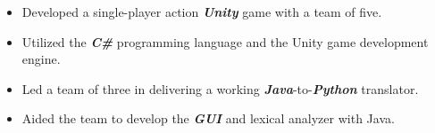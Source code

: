 \documentclass[10pt,a4paper,ragged2e,withhyper]{altacv}
\begin{document}
\begin{paracol}{2}
\begin{itemize}
\item Developed a single-player action \textbf{\textit{Unity}} game with a team of five.
\item Utilized the \textbf{\textit{C\#}} programming language and the Unity game development engine.
\end{itemize}

\divider


\begin{itemize}
\item Led a team of three in delivering a working \textbf{\textit{Java}}-to-\textbf{\textit{Python}} translator.  
\item Aided the team to develop the \textbf{\textit{GUI}} and lexical analyzer with Java.
\end{itemize}

\medskip









\end{paracol}
\end{document}
